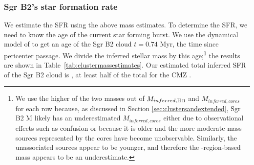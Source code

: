 \documentclass[twocolumn]{aastex61}
\begin{document}
\subsubsection{Sgr B2's star formation rate}
\label{sec:sfr}
We estimate the SFR using the above mass estimates.  To
determine the SFR, we need to know the age of the current star
forming burst.  We use the dynamical model of \citet{Kruijssen2015a} to get an
age of the Sgr B2 cloud $t=0.74$ Myr, the time since
pericenter passage.  We divide the inferred stellar mass by this
age;\footnote{We use the higher of the two masses out of $M_{inferred,\hii}$ and
$M_{inferred,cores}$ for each row because, as discussed in Section
\ref{sec:clustersandextended}, Sgr B2 M likely has an underestimated
$M_{inferred,cores}$ either due to observational effects such as confusion or
because it is older and the more moderate-mass sources represented by the cores
have become unobservable.  Similarly, the unassociated sources appear
to be younger, and therefore the \hii-region-based mass appears
to be an underestimate.} the results are shown in
Table~\ref{tab:clustermassestimates}.    Our estimated total inferred SFR of
the Sgr B2 cloud is \sfrdynagemax \msun \peryr,  at least half of the
total for the CMZ \citep[$\dot{M}_{CMZ}=0.07-0.12$ \msun
\peryr;][]{Longmore2013b,Barnes2017b}.  
\end{document}
